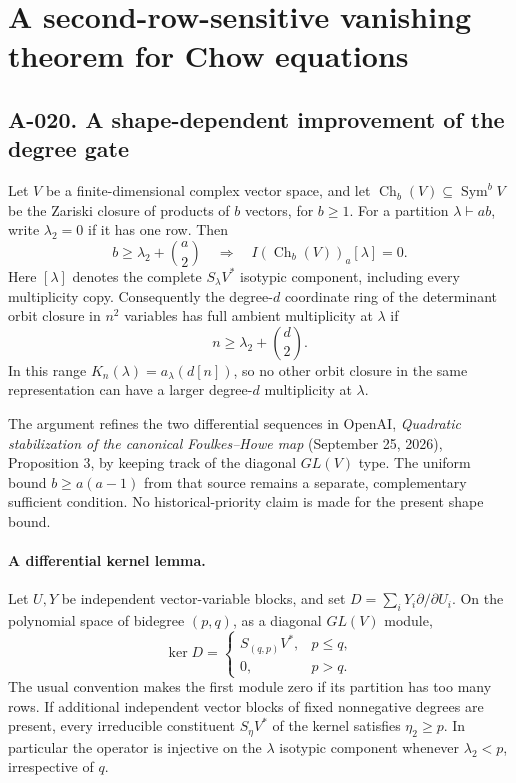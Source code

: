 \section{A second-row-sensitive vanishing theorem for Chow equations}

\subsection*{A-020. A shape-dependent improvement of the degree gate}
Let $V$ be a finite-dimensional complex vector space, and let
$\operatorname{Ch}_b(V)\subseteq\operatorname{Sym}^bV$ be the
Zariski closure of products of $b$ vectors, for $b\geq1$.
For a partition $\lambda\vdash ab$, write $\lambda_2=0$ if it
has one row. Then
\[
 b\geq\lambda_2+\binom a2
 \quad\Longrightarrow\quad
 I(\operatorname{Ch}_b(V))_a[\lambda]=0.                 \tag{A-020.1}
\]
Here $[\lambda]$ denotes the complete $S_\lambda V^*$ isotypic
component, including every multiplicity copy. Consequently the
degree-$d$ coordinate ring of the determinant orbit closure in
$n^2$ variables has full ambient multiplicity at $\lambda$ if
\[
                         n\geq\lambda_2+\binom d2.    \tag{A-020.2}
\]
In this range $K_n(\lambda)=a_\lambda(d[n])$, so no other
orbit closure in the same representation can have a larger
degree-$d$ multiplicity at $\lambda$.

The argument refines the two differential sequences in OpenAI,
\emph{Quadratic stabilization of the canonical Foulkes--Howe map}
(September 25, 2026), Proposition 3, by keeping track of the
diagonal $GL(V)$ type. The uniform bound $b\geq a(a-1)$ from
that source remains a separate, complementary sufficient
condition. No historical-priority claim is made for the present
shape bound.

\paragraph{A differential kernel lemma.}
Let $U,Y$ be independent vector-variable blocks, and set
$D=\sum_iY_i\partial/\partial U_i$. On the polynomial space
of bidegree $(p,q)$, as a diagonal $GL(V)$ module,
\[
 \ker D=
 \begin{cases}
 S_{(q,p)}V^*,&p\leq q,\\
 0,&p>q.
 \end{cases}                                          \tag{A-020.3}
\]
The usual convention makes the first module zero if its
partition has too many rows. If additional independent vector
blocks of fixed nonnegative degrees are present, every
irreducible constituent $S_\eta V^*$ of the kernel satisfies
$\eta_2\geq p$. In particular the operator is injective on
the $\lambda$ isotypic component whenever $\lambda_2<p$,
irrespective of $q$.

